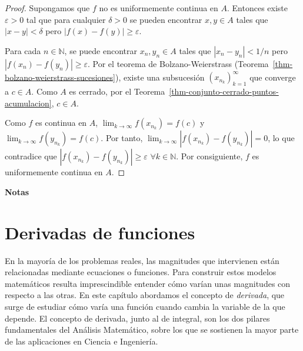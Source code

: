 \documentclass[
  a4paper,
]{scrreport}
\theoremstyle{plain}
\theoremstyle{definition}
\theoremstyle{plain}
\theoremstyle{plain}
\theoremstyle{definition}
\theoremstyle{definition}
\theoremstyle{remark}
\begin{document}
\begin{tcolorbox}[enhanced jigsaw, titlerule=0mm, arc=.35mm, colframe=quarto-callout-note-color-frame, bottomrule=.15mm, opacitybacktitle=0.6, rightrule=.15mm, coltitle=black, colback=white, toprule=.15mm, title=\textcolor{quarto-callout-note-color}{\faInfo}\hspace{0.5em}{Demostración}, leftrule=.75mm, bottomtitle=1mm, opacityback=0, breakable, colbacktitle=quarto-callout-note-color!10!white, toptitle=1mm, left=2mm]

\begin{proof}
Supongamos que \(f\) no es uniformemente continua en \(A\). Entonces
existe \(\varepsilon>0\) tal que para cualquier \(\delta>0\) se pueden
encontrar \(x,y\in A\) tales que \(|x-y|<\delta\) pero
\(|f(x)-f(y)|\geq \varepsilon\).

Para cada \(n\in\mathbb{N}\), se puede encontrar \(x_n,y_n\in A\) tales
que \(|x_n-y_n|<1/n\) pero \(|f(x_n)-f(y_n)|\geq \varepsilon\). Por el
teorema de Bolzano-Weierstrass
(Teorema~\ref{thm-bolzano-weierstrass-sucesiones}), existe una
subsucesión \((x_{n_k})_{k=1}^\infty\) que converge a \(c\in A\). Como
\(A\) es cerrado, por el
Teorema~\ref{thm-conjunto-cerrado-puntos-acumulacion}, \(c\in A\).

Como \(f\) es continua en \(A\), \(\lim_{k\to\infty}f(x_{n_k})=f(c)\) y
\(\lim_{k\to\infty}f(y_{n_k})=f(c)\). Por tanto,
\(\lim_{k\to\infty}|f(x_{n_k})-f(y_{n_k})|=0\), lo que contradice que
\(|f(x_{n_k})-f(y_{n_k})|\geq \varepsilon\) \(\forall k\in\mathbb{N}\).
Por consiguiente, \(f\) es uniformemente continua en \(A\).
\end{proof}

\end{tcolorbox}

\textbf{Notas}


\chapter{Derivadas de funciones}\label{derivadas-de-funciones}

En la mayoría de los problemas reales, las magnitudes que intervienen
están relacionadas mediante ecuaciones o funciones. Para construir estos
modelos matemáticos resulta imprescindible entender cómo varían unas
magnitudes con respecto a las otras. En este capítulo abordamos el
concepto de \emph{derivada}, que surge de estudiar cómo varía una
función cuando cambia la variable de la que depende. El concepto de
derivada, junto al de integral, son los dos pilares fundamentales del
Análisis Matemático, sobre los que se sostienen la mayor parte de las
aplicaciones en Ciencia e Ingeniería.
\end{document}
